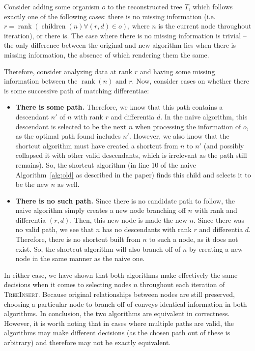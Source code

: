Consider adding some organism $o$ to the reconstructed tree $T$, which follows exactly one of the following cases: there is no missing information (i.e. $r = \operatorname{rank}(\operatorname{children}(n) \forall (r, d) \in o)$, where $n$ is the current node throughout iteration), or there is.
The case where there is no missing information is trivial -- the only difference between the original and new algorithm lies when there is missing information, the absence of which rendering them the same.

Therefore, consider analyzing data at rank $r$ and having some missing information between the $\operatorname{rank}(n)$ and $r$.
Now, consider cases on whether there is some successive path of matching differentiae:

\begin{itemize}
  \item \textbf{There is some path.}
  Therefore, we know that this path contains a descendant $n'$ of $n$ with rank $r$ and differentia $d$.
  In the naive algorithm, this descendant is selected to be the next $n$ when processing the information of $o$, as the optimal path found includes $n'$.
  However, we also know that the shortcut algorithm must have created a shortcut from $n$ to $n'$ (and possibly collapsed it with other valid descendants, which is irrelevant as the path still remains).
  So, the shortcut algorithm (in line 10 of the naive Algorithm~\ref{alg:old} as described in the paper) finds this child and selects it to be the new $n$ as well.
  \item \textbf{There is no such path.}
  Since there is no candidate path to follow, the naive algorithm simply creates a new node branching off $n$ with rank and differentia $(r, d)$.
  Then, this new node is made the new $n$.
  Since there was no valid path, we see that $n$ has no descendants with rank $r$ and differentia $d$.
  Therefore, there is no shortcut built from $n$ to such a node, as it does not exist.
  So, the shortcut algorithm will also branch off of $n$ by creating a new node in the same manner as the naive one.
\end{itemize}

In either case, we have shown that both algorithms make effectively the same decisions when it comes to selecting nodes $n$ throughout each iteration of \textsc{TreeInsert}.
Because original relationships between nodes are still preserved, choosing a particular node to branch off of conveys identical information in both algorithms.
In conclusion, the two algorithms are equivalent in correctness.
However, it is worth noting that in cases where multiple paths are valid, the algorithms may make different decisions (as the chosen path out of these is arbitrary) and therefore may not be exactly equivalent.


